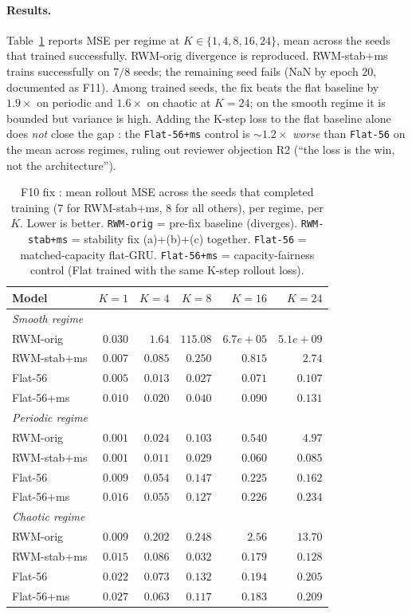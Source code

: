 \documentclass[11pt,a4paper]{article}
\begin{document}
\paragraph{Results.} Table~\ref{tab:rwm-rollout-fix} reports MSE per regime
at $K \in \{1, 4, 8, 16, 24\}$, mean across the seeds that trained
successfully. RWM-orig divergence is reproduced. RWM-stab+ms trains
successfully on $7/8$ seeds; the remaining seed fails (NaN by epoch 20,
documented as F11). Among trained seeds, the fix beats the flat baseline by
$1.9{\times}$ on periodic and $1.6{\times}$ on chaotic at $K{=}24$; on
the smooth regime it is bounded but variance is high. Adding the K-step
loss to the flat baseline alone does \emph{not} close the gap : the
\texttt{Flat-56+ms} control is $\sim 1.2{\times}$ \emph{worse} than
\texttt{Flat-56} on the mean across regimes, ruling out reviewer objection
R2 (``the loss is the win, not the architecture'').

\begin{table}[h]
\centering
\caption{F10 fix : mean rollout MSE across the seeds that completed
training (7 for RWM-stab+ms, 8 for all others), per regime, per $K$.
Lower is better. \texttt{RWM-orig} = pre-fix baseline (diverges).
\texttt{RWM-stab+ms} = stability fix (a)+(b)+(c) together.
\texttt{Flat-56} = matched-capacity flat-GRU.
\texttt{Flat-56+ms} = capacity-fairness control (Flat trained with the same
K-step rollout loss).}
\label{tab:rwm-rollout-fix}
\begin{tabular}{lrrrrr}
\toprule
Model & $K{=}1$ & $K{=}4$ & $K{=}8$ & $K{=}16$ & $K{=}24$ \\
\midrule
\multicolumn{6}{l}{\textit{Smooth regime}} \\
RWM-orig    & $0.030$ & $1.64$ & $115.08$ & $6.7e+05$ & $5.1e+09$ \\
RWM-stab+ms & $0.007$ & $0.085$ & $0.250$ & $0.815$ & $2.74$ \\
Flat-56     & $0.005$ & $0.013$ & $0.027$ & $0.071$ & $0.107$ \\
Flat-56+ms  & $0.010$ & $0.020$ & $0.040$ & $0.090$ & $0.131$ \\
\multicolumn{6}{l}{\textit{Periodic regime}} \\
RWM-orig    & $0.001$ & $0.024$ & $0.103$ & $0.540$ & $4.97$ \\
RWM-stab+ms & $0.001$ & $0.011$ & $0.029$ & $0.060$ & $0.085$ \\
Flat-56     & $0.009$ & $0.054$ & $0.147$ & $0.225$ & $0.162$ \\
Flat-56+ms  & $0.016$ & $0.055$ & $0.127$ & $0.226$ & $0.234$ \\
\multicolumn{6}{l}{\textit{Chaotic regime}} \\
RWM-orig    & $0.009$ & $0.202$ & $0.248$ & $2.56$ & $13.70$ \\
RWM-stab+ms & $0.015$ & $0.086$ & $0.032$ & $0.179$ & $0.128$ \\
Flat-56     & $0.022$ & $0.073$ & $0.132$ & $0.194$ & $0.205$ \\
Flat-56+ms  & $0.027$ & $0.063$ & $0.117$ & $0.183$ & $0.209$ \\
\bottomrule
\end{tabular}
\end{table}
\end{document}
